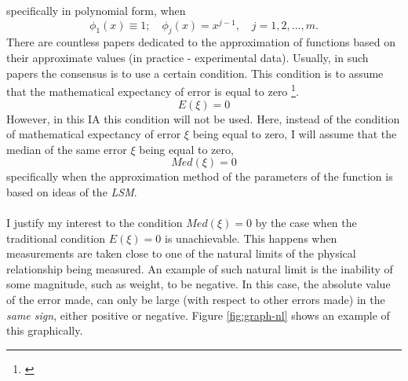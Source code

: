 specifically in polynomial form, when
\begin{equation}
\phi_{1}(x)\equiv 1; \quad \phi_{j}(x)=x^{j-1},\quad j=1,2,\dots,m.
\end{equation}
There are countless papers dedicated to the approximation of functions based on their approximate values (in practice - experimental data). Usually, in such papers the consensus is to use a certain condition. This condition is to assume that the mathematical expectancy of error is equal to zero \footnote{\cite{Plackett_1950}}.
\begin{equation}
E(\xi)=0
\end{equation}
 However, in this IA this condition will not be used. Here, instead of the condition of mathematical expectancy of error $\xi$ being equal to zero, I will assume that the median of the same error $\xi$ being equal to zero, 
\begin{equation}
Med(\xi)=0
\end{equation}
specifically when the approximation method of the parameters of the function is based on ideas of the \textit{LSM}. \\
\\
I justify my interest to the condition $Med(\xi)=0$ by the case when the traditional condition $E(\xi)=0$ is unachievable. This happens when measurements are taken close to one of the natural limits of the physical relationship being measured. An example of such natural limit is the inability of some magnitude, such as weight, to be negative. In this case, the absolute value of the error made, can only be large (with respect to other errors made) in the \textit{same sign}, either positive or negative. Figure \ref{fig:graph-nl} shows an example of this graphically.
